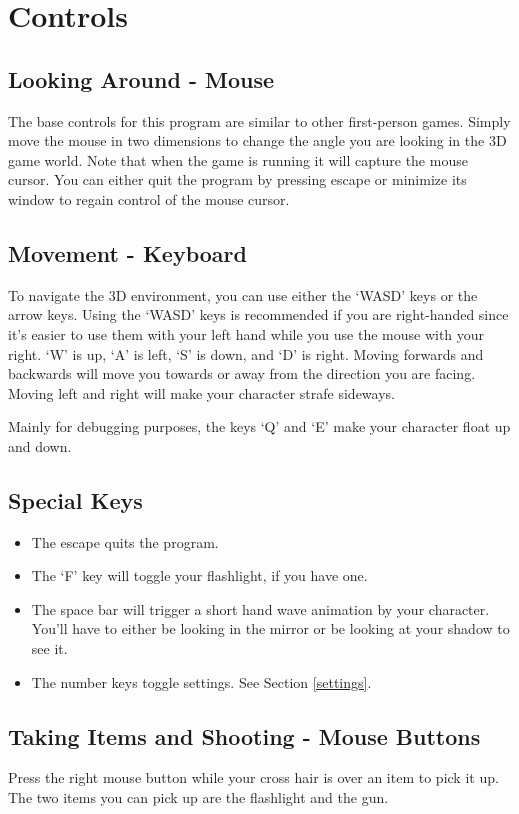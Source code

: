 \documentclass{book}
\begin{document}
  \section{Controls}
    \subsection{Looking Around - Mouse}
      The base controls for this program are similar to other first-person games.
      Simply move the mouse in two dimensions to change the angle you are looking in the 3D game world.
      Note that when the game is running it will capture the mouse cursor. You can either quit the program by pressing escape or minimize its window to regain control of the mouse cursor.

    \subsection{Movement - Keyboard}
      To navigate the 3D environment, you can use either the `WASD' keys or the arrow keys. Using the `WASD' keys is recommended if you are right-handed since it's easier to use them with your left hand while you use the mouse with your right. `W' is up, `A' is left, `S' is down, and `D' is right. Moving forwards and backwards will move you towards or away from the direction you are facing. Moving left and right will make your character strafe sideways.

      Mainly for debugging purposes, the keys `Q' and `E' make your character float up and down.

    \subsection{Special Keys}
      \begin{itemize}
        \item The escape quits the program.
        \item The `F' key will toggle your flashlight, if you have one.
        \item The space bar will trigger a short hand wave animation by your character. You'll have to either be looking in the mirror or be looking at your shadow to see it.
        \item The number keys toggle settings. See Section \ref{settings}.
      \end{itemize}

    \subsection{Taking Items and Shooting - Mouse Buttons}
      Press the right mouse button while your cross hair is over an item to pick it up. The two items you can pick up are the flashlight and the gun.
\end{document}
